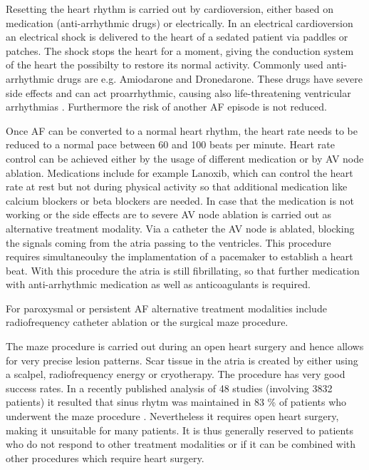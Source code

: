 \documentclass[type=dr, dr=rernat, accentcolor=tud7b,colorbacktitle, bigchapter, openright, twoside, 12pt ]{tudthesis}
\begin{document}
Resetting the heart rhythm is carried out by cardioversion, either based on medication (anti-arrhythmic drugs) or electrically. In an 
electrical cardioversion an electrical shock is delivered to the heart of a sedated patient via paddles or patches. The shock stops the 
heart for a moment, giving the conduction system of the heart the possibilty to restore its normal activity. Commonly used anti-arrhythmic 
drugs are e.g. Amiodarone and Dronedarone. These drugs have severe side effects and can act proarrhythmic, causing also 
life-threatening ventricular arrhythmias \cite{Mayo}. Furthermore the risk of another AF episode is not reduced.\newline

Once AF can be converted to a normal heart rhythm, the heart rate needs to be reduced to a normal pace between 60 and 100 beats per minute. 
Heart rate control can be achieved either by the usage of different medication or by AV node ablation. Medications include for example 
Lanoxib, which can control the heart rate at rest but not during physical activity so that additional medication like calcium blockers or 
beta blockers are needed. In case that the medication is not working or the side effects are to severe AV node ablation is carried out as 
alternative treatment modality. Via a catheter the AV node is ablated, blocking the signals coming from the atria passing to the ventricles. 
This procedure requires simultaneoulsy the implamentation of a pacemaker to establish a heart beat. With this procedure the atria is still 
fibrillating, so that further medication with anti-arrhythmic medication as well as anticoagulants is required.\newline

For paroxysmal or persistent AF alternative treatment modalities include radiofrequency catheter ablation or the surgical maze 
procedure.\newline

The maze procedure is carried out during an open heart surgery and hence allows for very precise lesion patterns. Scar tissue in the atria 
is created by either using a scalpel, radiofrequency energy or cryotherapy. The procedure has very good success rates. In a recently 
published analysis of 48 studies (involving 3832 patients) it resulted that sinus rhytm was maintained in 83 \% of patients who underwent 
the maze procedure \cite{CE09} \cite{Kha05}. Nevertheless it requires open heart surgery, making it unsuitable for many patients. It is 
thus generally reserved to patients who do not respond to other treatment modalities or if it can be combined with other procedures which 
require heart surgery. \newline
\end{document}

